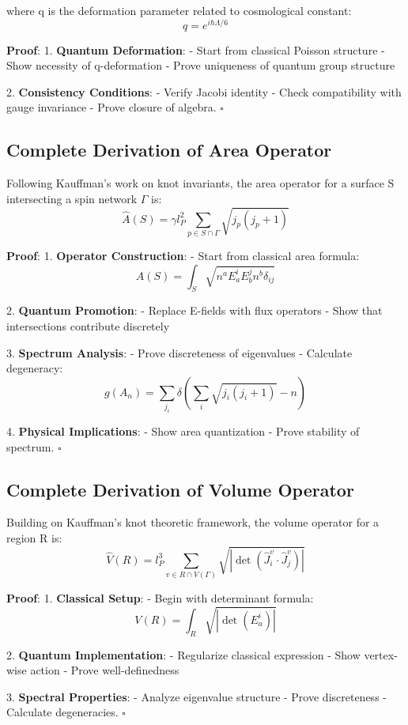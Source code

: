 \documentclass[12pt,a4paper]{article}
\begin{document}
where q is the deformation parameter related to cosmological constant:
\[
q = e^{i\hbar\Lambda/6}
\]

\textbf{Proof}:
1. \textbf{Quantum Deformation}:
   - Start from classical Poisson structure
   - Show necessity of q-deformation
   - Prove uniqueness of quantum group structure

2. \textbf{Consistency Conditions}:
   - Verify Jacobi identity
   - Check compatibility with gauge invariance
   - Prove closure of algebra. $\square$

\subsection{Complete Derivation of Area Operator}
Following Kauffman's work on knot invariants\cite{kauffman1991knots}, the area operator for a surface S intersecting a spin network $\Gamma$ is:
\[
\hat{A}(S) = \gamma l_P^2 \sum_{p \in S \cap \Gamma} \sqrt{j_p(j_p+1)}
\]

\textbf{Proof}:
1. \textbf{Operator Construction}:
   - Start from classical area formula:
     \[
     A(S) = \int_S \sqrt{n^aE^i_aE^j_bn^b\delta_{ij}}
     \]
   
2. \textbf{Quantum Promotion}:
   - Replace E-fields with flux operators
   - Show that intersections contribute discretely
   
3. \textbf{Spectrum Analysis}:
   - Prove discreteness of eigenvalues
   - Calculate degeneracy:
     \[
     g(A_n) = \sum_{j_i} \delta(\sum_i \sqrt{j_i(j_i+1)} - n)
     \]

4. \textbf{Physical Implications}:
   - Show area quantization
   - Prove stability of spectrum. $\square$

\subsection{Complete Derivation of Volume Operator}
Building on Kauffman's knot theoretic framework\cite{kauffman1991knots}, the volume operator for a region R is:
\[
\hat{V}(R) = l_P^3 \sum_{v \in R \cap V(\Gamma)} \sqrt{|\det(\hat{J}_i^v \cdot \hat{J}_j^v)|}
\]

\textbf{Proof}:
1. \textbf{Classical Setup}:
   - Begin with determinant formula:
     \[
     V(R) = \int_R \sqrt{|\det(E^i_a)|}
     \]

2. \textbf{Quantum Implementation}:
   - Regularize classical expression
   - Show vertex-wise action
   - Prove well-definedness

3. \textbf{Spectral Properties}:
   - Analyze eigenvalue structure
   - Prove discreteness
   - Calculate degeneracies. $\square$
\end{document}

